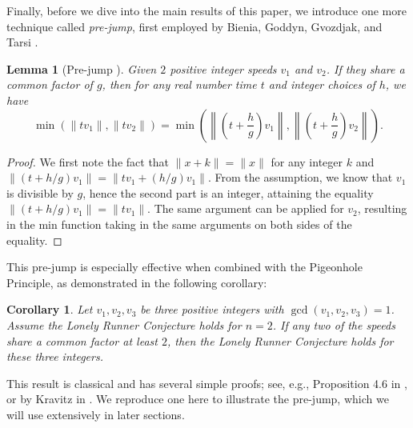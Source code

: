 \documentclass[11pt]{amsart}
\newtheorem{lemma}{Lemma}[section]
\newtheorem{cor}{Corollary}[section]
\newcommand{\norm}[1]{\lVert #1 \rVert}
\newcommand{\Norm}[1]{\left\lVert #1 \right\rVert}
\begin{document}
Finally, before we dive into the main results of this paper, we introduce one more technique called \emph{pre-jump}, first employed by Bienia, Goddyn, Gvozdjak, and Tarsi \cite{BIENIA19981}.

\begin{lemma}[Pre-jump \cite{BIENIA19981}]
    Given $2$ positive integer speeds $v_1$ and $v_2$. If they share a common factor of $g$, then for any real number time $t$ and integer choices of $h$, we have
    $$\min(\norm{tv_1},\norm{tv_2}) = \min\left(\Norm{\left(t + \frac{h}{g}\right)v_1},\Norm{\left(t + \frac{h}{g}\right)v_2}\right).$$
\end{lemma}

\begin{proof}
    We first note the fact that $\norm{x + k} = \norm{x}$ for any integer $k$ and $\norm{(t + h / g)v_1} = \norm{tv_1 + (h / g)v_1}$. From the assumption, we know that $v_1$ is divisible by $g$, hence the second part is an integer, attaining the equality $\norm{(t + h / g)v_1} = \norm{tv_1}$. The same argument can be applied for $v_2$, resulting in the min function taking in the same arguments on both sides of the equality.
\end{proof}

This pre-jump is especially effective when combined with the Pigeonhole Principle, as demonstrated in the following corollary:

\begin{cor}
Let $v_1,v_2,v_3$ be three positive integers with $\gcd(v_1,v_2,v_3)=1$. Assume the Lonely Runner Conjecture holds for $n=2$. If any two of the speeds share a common factor at least $2$, then the Lonely Runner Conjecture holds for these three integers.
\end{cor}

This result is classical and has several simple proofs; see, e.g., Proposition 4.6 in \cite{jana}, or by Kravitz in \cite{kravitz}.  We reproduce one here to illustrate the pre-jump, which we will use extensively in later sections.
\end{document}
